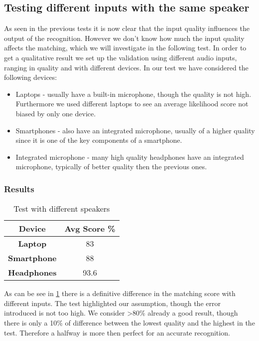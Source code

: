 \subsection{Testing different inputs with the same speaker}

As seen in the previous tests it is now clear that the input quality influences the output
of the recognition. However we don't know how much the input quality affects the matching,
which we will investigate in the following test. In order to get a qualitative result
we set up the validation using different audio inputs, ranging in quality and with different
devices. In our test we have considered the following devices:

\begin{itemize}
    \item Laptops - usually have a built-in microphone, though the quality
    is not high. Furthermore we used different laptops to see an average likelihood
    score not biased by only one device.
    \item Smartphones - also have an integrated microphone, usually of a higher quality
    since it is one of the key components of a smartphone.
    \item Integrated microphone - many high quality headphones have an integrated
    microphone, typically of better quality then the previous ones.
\end{itemize}

\subsubsection{Results}

\begin{table}
    \label{tab:inputres}
\centering
\caption{Test with different speakers}
\begin{tabular}{|c|c|} \hline
\textbf{Device} & \textbf{Avg Score \%} \\ \hline
\textbf{Laptop} & 83 \\ \hline
\textbf{Smartphone} & 88  \\ \hline
\textbf{Headphones} & 93.6  \\ \hline
\end{tabular}
\end{table}

As can be see in \ref{tab:inputres} there is a definitive difference in the matching score
with different inputs. The test highlighted our assumption, though the error introduced is
not too high. We consider \textgreater 80\% already a good result, though there is only a 10\%
of difference between the lowest quality and the highest in the test. Therefore a halfway
is more then perfect for an accurate recognition.




